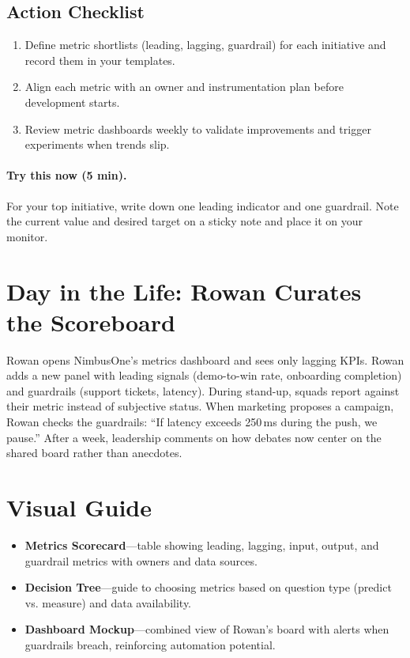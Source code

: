 \subsection{Action Checklist}
\begin{enumerate}
    \item Define metric shortlists (leading, lagging, guardrail) for each initiative and record them in your templates.
    \item Align each metric with an owner and instrumentation plan before development starts.
    \item Review metric dashboards weekly to validate improvements and trigger experiments when trends slip.
\end{enumerate}

\paragraph{Try this now (5 min).} For your top initiative, write down one leading indicator and one guardrail. Note the current value and desired target on a sticky note and place it on your monitor.

\section{Day in the Life: Rowan Curates the Scoreboard}
Rowan opens NimbusOne’s metrics dashboard and sees only lagging KPIs. Rowan adds a new panel with leading signals (demo-to-win rate, onboarding completion) and guardrails (support tickets, latency). During stand-up, squads report against their metric instead of subjective status. When marketing proposes a campaign, Rowan checks the guardrails: ``If latency exceeds 250\,ms during the push, we pause.'' After a week, leadership comments on how debates now center on the shared board rather than anecdotes.

\section{Visual Guide}
\label{sec:metrics-visuals}
\begin{itemize}
    \item \textbf{Metrics Scorecard}—table showing leading, lagging, input, output, and guardrail metrics with owners and data sources.
    \item \textbf{Decision Tree}—guide to choosing metrics based on question type (predict vs. measure) and data availability.
    \item \textbf{Dashboard Mockup}—combined view of Rowan’s board with alerts when guardrails breach, reinforcing automation potential.
\end{itemize}

